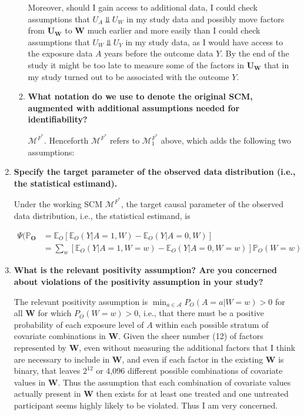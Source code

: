 \documentclass{article}\usepackage[]{graphicx}\usepackage[]{xcolor}
\begin{document}
\begin{enumerate}[label=\textbf{\arabic*.}]
\begin{enumerate}[label=\textbf{(\alph*)}]
Moreover, should I gain access to additional data, I could check assumptions that $U_A \Perp U_W$ in my study data and possibly move factors from $\bm{U_W}$ to $\bm{W}$ much earlier and more easily than I could check assumptions that $U_W \Perp U_Y$ in my study data, as I would have access to the exposure data $A$ years before the outcome data $Y$. By the end of the study it might be too late to measure some of the factors in $\bm{U_W}$ that in my study turned out to be associated with the outcome $Y$.
    
    \item \textbf{What notation do we use to denote the original SCM, augmented with additional assumptions needed for identifiability?}
    
    $\mathcal{M}^{F^*}$. Henceforth $\mathcal{M}^{F^*}$ refers to $\mathcal{M}^{F^*}_1$ above, which adds the following two assumptions:
    
    
  \end{enumerate}
  
  \item \textbf{Specify the target parameter of the observed data distribution (i.e., the statistical estimand).}
  
Under the working SCM $\mathcal{M}^{F^*}$, the target causal parameter of the observed data distribution, i.e., the statistical estimand, is 
  
\begin{align*}
\Psi(\mathbb{P}_{\bm{O}} &= \mathbb{E}_O[\mathbb{E}_O(Y|A=1,W) - \mathbb{E}_O(Y|A=0,W)] \\
&= \sum_{w}[\mathbb{E}_O(Y|A=1,W=w) - \mathbb{E}_O(Y|A=0,W=w)]\mathbb{P}_O(W=w)
\end{align*}
  
  \item \textbf{What is the relevant positivity assumption? Are you concerned about violations of the positivity assumption in your study?}
  
The relevant positivity assumption is $\min_{a \in \mathcal{A}}P_O(A=a|W=w)>0$ for all $\bm{W}$ for which $P_O(W=w)>0$, i.e., that there must be a positive probability of each exposure level of $A$ within each possible stratum of covariate combinations in $\bm{W}$. Given the sheer number (12) of factors represented by $\bm{W}$, even without measuring the additional factors that I think are necessary to include in $\bm{W}$, and even if each factor in the existing $\bm{W}$ is binary, that leaves $2^12$ or 4,096 different possible combinations of covariate values in $\bm{W}$. Thus the assumption that each combination of covariate values actually present in $\bm{W}$ then exists for at least one treated and one untreated participant seems highly likely to be violated. Thus I am very concerned.

\end{enumerate}
\end{document}
